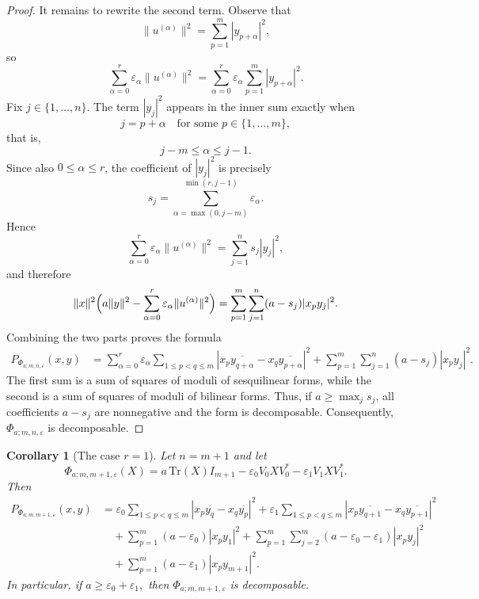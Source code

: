 \documentclass[12pt,a4paper]{amsart}
\theoremstyle{plain}
\newtheorem{corollary}[theorem]{Corollary}
\theoremstyle{remark}
\theoremstyle{definition}
\newcommand{\Tr}{{\textrm{Tr}}}
\begin{document}
\begin{proof}
	It remains to rewrite the second term. Observe that
	\[
	\|u^{(\alpha)}\|^2=\sum_{p=1}^m |y_{p+\alpha}|^2,
	\]
	so
	\[
	\sum_{\alpha=0}^{r}\varepsilon_\alpha \|u^{(\alpha)}\|^2
	=
	\sum_{\alpha=0}^{r}\varepsilon_\alpha\sum_{p=1}^m |y_{p+\alpha}|^2.
	\]
	Fix $j\in\{1,\dots,n\}$. The term $|y_j|^2$ appears in the inner sum exactly when
	\[
	j=p+\alpha
	\quad\text{for some }p\in\{1,\dots,m\},
	\]
	that is,
	\[
	j-m\le \alpha\le j-1.
	\]
	Since also $0\le \alpha\le r$, the coefficient of $|y_j|^2$ is precisely
	\[
	s_j=\sum_{\alpha=\max(0,j-m)}^{\min(r,j-1)}\varepsilon_\alpha.
	\]
	Hence
	\[
	\sum_{\alpha=0}^{r}\varepsilon_\alpha \|u^{(\alpha)}\|^2
	=
	\sum_{j=1}^n s_j |y_j|^2,
	\]
	and therefore
	\[
	\|x\|^2\Bigl(a\|y\|^2-\sum_{\alpha=0}^{r}\varepsilon_\alpha\|u^{(\alpha)}\|^2\Bigr)
	=
	\sum_{p=1}^m\sum_{j=1}^n (a-s_j)|x_p y_j|^2.
	\]
	Combining the two parts proves the formula
	\[
	\begin{aligned}
		P_{\Phi_{a;m,n,\varepsilon}}(x,y)
		&=
		\sum_{\alpha=0}^{r}\varepsilon_\alpha
		\sum_{1\le p<q\le m}
		\left|x_p\overline{y_{q+\alpha}}-x_q\overline{y_{p+\alpha}}\right|^2
		+\sum_{p=1}^m\sum_{j=1}^n (a-s_j)|x_p y_j|^2.
	\end{aligned}
	\]
	The first sum is a sum of squares of moduli of sesquilinear forms, while the second is a sum of squares of moduli of bilinear forms. Thus, if $a\ge \max_j s_j$, all coefficients $a-s_j$ are nonnegative and the form is decomposable. Consequently, $\Phi_{a;m,n,\varepsilon}$ is decomposable.
\end{proof}

\begin{corollary}[The case $r=1$] \rm
	Let $n=m+1$ and let
	\[
	\Phi_{a;m,m+1,\varepsilon}(X)
	=
	a\,\Tr(X)I_{m+1}
	-\varepsilon_0V_0XV_0^*
	-\varepsilon_1V_1XV_1^*.
	\]
	Then
	\[
	\begin{aligned}
		P_{\Phi_{a;m,m+1,\varepsilon}}(x,y)
		& =
		\varepsilon_0\sum_{1\le p<q\le m}
		|x_p\overline{y_q}-x_q\overline{y_p}|^2
		+ \varepsilon_1\sum_{1\le p<q\le m}
		|x_p\overline{y_{q+1}}-x_q\overline{y_{p+1}}|^2\\
	  	&\quad  + \sum_{p=1}^m (a-\varepsilon_0)|x_p y_1|^2 +
		\sum_{p=1}^m\sum_{j=2}^{m}(a-\varepsilon_0-\varepsilon_1)|x_p y_j|^2\\
		&\quad+
		\sum_{p=1}^m (a-\varepsilon_1)|x_p y_{m+1}|^2.
	\end{aligned}
	\]
	In particular, if $a\ge \varepsilon_0+\varepsilon_1,$
	then $\Phi_{a;m,m+1,\varepsilon}$ is decomposable.
\end{corollary}
\end{document}
